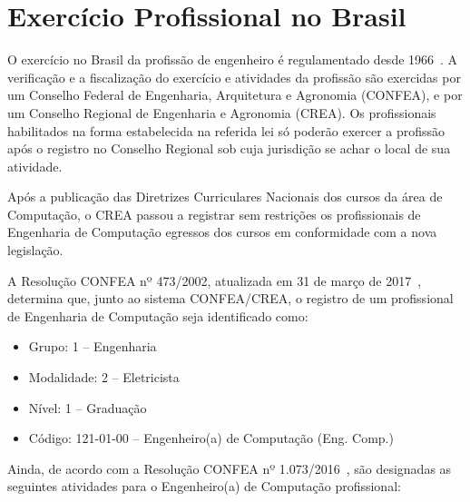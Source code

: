 \section{Exercício Profissional no Brasil}

O exercício no Brasil da profissão de engenheiro é regulamentado desde 1966~\cite{Lei:5194:1966}. A verificação e a fiscalização do exercício e atividades da profissão são exercidas por um Conselho Federal de Engenharia, Arquitetura e Agronomia (CONFEA), e por um Conselho Regional de Engenharia e Agronomia (CREA). Os profissionais habilitados na forma estabelecida na referida lei só poderão exercer a profissão após o registro no Conselho Regional sob cuja jurisdição se achar o local de sua atividade.

Após a publicação das Diretrizes Curriculares Nacionais dos cursos da área de Computação, o CREA passou a registrar sem restrições os profissionais de Engenharia de Computação egressos dos cursos em conformidade com a nova legislação.

A Resolução CONFEA nº 473/2002, atualizada em 31 de março de 2017~\cite{CONFEA:473:2002}, determina que, junto ao sistema CONFEA/CREA, o registro de um profissional de Engenharia de Computação seja identificado como:

\begin{itemize}
    \item Grupo: 1 -- Engenharia
    \item Modalidade: 2 -- Eletricista
    \item Nível: 1 -- Graduação
    \item Código: 121-01-00 -- Engenheiro(a) de Computação (Eng. Comp.)
\end{itemize}

Ainda, de acordo com a Resolução CONFEA nº 1.073/2016~\cite{CONFEA:1073:2016}, são designadas as seguintes atividades para o Engenheiro(a) de Computação profissional:

